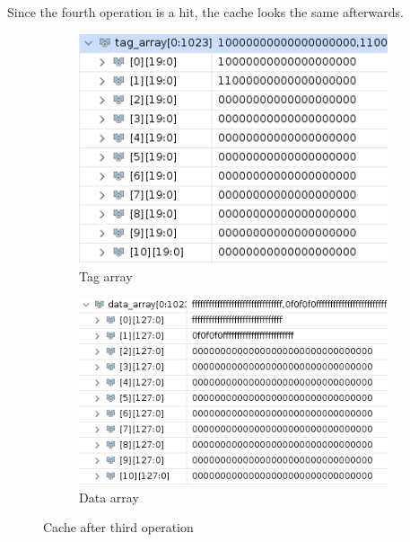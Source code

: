 \documentclass{article}
\begin{document}
Since the fourth operation is a hit, the cache looks the same afterwards.
\begin{figure}[H]
\centering
\begin{subfigure}{.5\textwidth}
  \centering
  \includegraphics[width=.8\linewidth]{img/tag2.png}
  \caption{Tag array}
\end{subfigure}%
\begin{subfigure}{.5\textwidth}
  \centering
  \includegraphics[width=.9\linewidth]{img/data2.png}
  \caption{Data array}
\end{subfigure}
\caption{Cache after third operation}
\end{figure}
\end{document}

